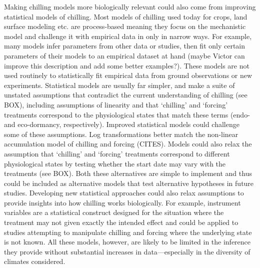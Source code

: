 \documentclass[11pt]{article}
\begin{document}
Making chilling models more biologically relevant could also come from improving statistical models of chilling. Most models of chilling used today for crops, land surface modeling etc. are process-based meaning they focus on the mechanistic model and challenge it with empirical data in only in narrow ways. For example, many models infer parameters from other data or studies, then fit only certain parameters of their models to an empirical dataset at hand \citep{richardson1974} (maybe Victor can improve this description and add some better examples?). These models are not used routinely to statistically fit empirical data from ground observations or new experiments. Statistical models are usually far simpler, and make a suite of unstated assumptions that contradict the current understanding of chilling (see BOX), including assumptions of linearity and that `chilling' and `forcing' treatments correspond to the physiological states that match these terms (endo- and eco-dormancy, respectively). Improved statistical models could challenge some of these assumptions. Log transformations better match the non-linear accumulation model of chilling and forcing (CITES). Models could also relax the assumption that  `chilling' and `forcing' treatments correspond to different physiological states by testing whether the start date may vary with the treatments (see BOX). Both these alternatives are simple to implement and thus could be included as alternative models that test alternative hypotheses in future studies. Developing new statistical approaches could also relax assumptions to provide insights into how chilling works biologically. For example, instrument variables are a statistical construct designed for the situation where the treatment may not given exactly the intended effect and could be applied to studies attempting to manipulate chilling and forcing where the underlying state is not known. All these models, however, are likely to be limited in the inference they provide without substantial increases in data---especially in the diversity of climates considered. 
\end{document}
